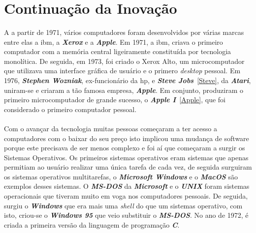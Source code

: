 \documentclass{report}
\begin{document}
\section{Continuação da Inovação}
\paragraph{}
A a partir de 1971, vários computadores foram desenvolvidos por várias marcas entre elas a \acs{ibm}, a \textbf{\textit{Xerox}} e a \textbf{\textit{Apple}}.
Em 1971, a \acs{ibm}, criava o primeiro computador com a memória central ligeiramente constituída por tecnologia monolítica. De seguida, em 1973, foi criado o Xerox Alto, um microcomputador que utilizava uma interface gráfica de usuário e o primero \textit{desktop} pessoal. \newline
Em 1976, \textbf{\textit{Stephen Wozniak}}, ex-funcionário da \acs{hp}, e \textbf{\textit{Steve Jobs}}~\ref{Steve}, da \textbf{\textit{Atari}}, uniram-se e criaram a tão famosa empresa, \textbf{\textit{Apple}}. Em conjunto, produziram o primeiro microcomputador de grande sucesso, o \textbf{\textit{Apple I}}~\ref{Apple}, que foi considerado o primeiro computador pessoal.
\paragraph{}
Com o avançar da tecnologia muitas pessoas começaram a ter acesso a computadores com o baixar do seu preço isto implicou uma mudança de software porque este precisava de ser menos complexo e foi aí que começaram a surgir os Sistemas Operativos.\newline
Os primeiros sistemas operativos eram sistemas que apenas permitiam ao usuário realizar uma única tarefa de cada vez, de seguida surguiram os sistemas operativos multitarefas, o \textbf{\textit{Microsoft Windows}} e o \textbf{\textit{MacOS}} são exemplos desses sistemas. O \textbf{\textit{MS-DOS}} da \textbf{\textit{Microsoft}} e o \textbf{\textit{UNIX}} foram sistemas operacionais que tiveram muito em voga nos computadores pessoais. De seguida, surgiu o \textbf{\textit{Windows}} que era mais uma \textit{shell} do que um sistemas operativo, com isto, criou-se o \textbf{\textit{Windows 95}} que veio substituir o \textbf{\textit{MS-DOS}}. \newline
No ano de 1972, é criada a primeira versão da linguagem de programação \textbf{\textit{C}}.
\end{document}
